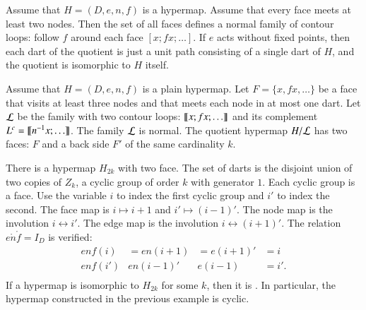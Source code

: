 \begin{example}\label{ex:Hall} 
  Assume that $H=(D,e,n,f)$ is a
  hypermap. %
  Assume that every face meets at least two nodes. Then the set of all
  faces defines a normal family of contour loops: follow $f$ around
  each face $[x;f x;\ldots]$.  If $e$ acts without fixed points, then
  each dart of the quotient is just a unit path consisting of a single
  dart of $H$, and the quotient is isomorphic to $H$ itself.
\end{example}

\begin{example}\label{ex:H2} 
  Assume that $H=(D,e,n,f)$ is a plain hypermap.  Let $F = \{x,f x,\ldots\}$ be a face
  that visits at least three nodes and that meets each node in at most
  one dart.  Let $\cal L$ be the family with two contour loops: ${\llbracket{x;f x;\ldots}\rrbracket}$ 
and its complement $L^c = {\llbracket{n^{-1} x;\ldots}\rrbracket}$.
The family $\cal L$ is normal. The quotient hypermap $H/{\cal L}$ has
two faces: $F$ and a back side $F'$ of the same cardinality $k$.
%
\end{example}

\begin{example}[cyclic]\label{ex:H2k} 
There is a hypermap $H_{2k}$ with two face.  The set of darts is the
disjoint union of two copies of $Z_k$, a cyclic group of order $k$
with generator $1$.  Each cyclic group is a face.  Use the variable
$i$ to index the first cyclic group and $i'$ to index the second.
The face map is $i\mapsto i+1$ and $i'\mapsto (i-1)'$.  The node map
is the involution $i\leftrightarrow i'$.  The edge map is the
involution $i\leftrightarrow (i+1)'$.  The relation $e\ocirc n\ocirc
f = I_D$ is verified:
\begin{displaymath}
\begin{array}{llllllll}
enf(i) &= e n(i+1) &= e(i+1)' &= i\\
e n f (i') & e n (i-1)' & e (i-1) &= i'.\\
\end{array}
\end{displaymath}
If a hypermap is isomorphic to $H_{2k}$ for
some $k$, then it is .  In particular,
the hypermap constructed in the previous example is cyclic.
%
%
\end{example}


